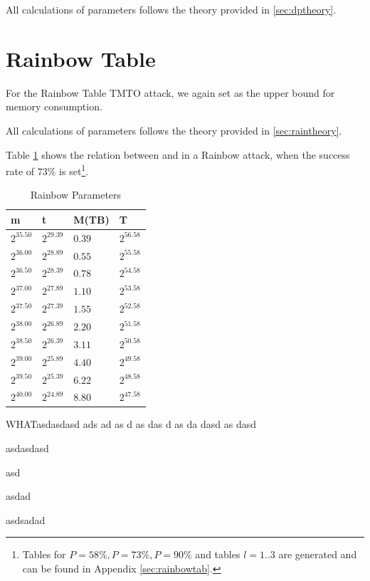 All calculations of parameters follows the theory provided in \ref{sec:dptheory}.
\newpage
\section{Rainbow Table}
For the Rainbow Table TMTO attack, we again set  as the
upper bound for memory consumption. 

All calculations of parameters follows the theory provided in
\ref{sec:raintheory}. 

Table \ref{tab:rainparam1} shows the relation between  and
 in a Rainbow attack, when the success rate of $73\%$ is set\footnote{Tables for $P = 58\%, P = 73\%, P = 90\%$ and tables $l=1..3$ are generated and can be
found in Appendix \ref{sec:rainbowtab}.}.
\begin{table}[H]
  \centering
  \begin{tabular}{llll}
    m & t & M(TB) & T \\ \hline
    $2^{35.50}$ & $2^{29.39}$ & $0.39$ & $2^{56.58}$ \\
    $2^{36.00}$ & $2^{28.89}$ & $0.55$ & $2^{55.58}$ \\
    $2^{36.50}$ & $2^{28.39}$ & $0.78$ & $2^{54.58}$ \\
    $2^{37.00}$ & $2^{27.89}$ & $1.10$ & $2^{53.58}$ \\
    $2^{37.50}$ & $2^{27.39}$ & $1.55$ & $2^{52.58}$ \\
    $2^{38.00}$ & $2^{26.89}$ & $2.20$ & $2^{51.58}$ \\
    $2^{38.50}$ & $2^{26.39}$ & $3.11$ & $2^{50.58}$ \\
    $2^{39.00}$ & $2^{25.89}$ & $4.40$ & $2^{49.58}$ \\
    $2^{39.50}$ & $2^{25.39}$ & $6.22$ & $2^{48.58}$ \\
    $2^{40.00}$ & $2^{24.89}$ & $8.80$ & $2^{47.58}$ \\
  \end{tabular}
  \caption{Rainbow Parameters}
  \label{tab:rainparam1}
\end{table}


WHATasdasdasd
ads
ad
as
d
as
das
d
as
da
dasd
as
dasd

asdasdasd

asd

asdad

asdsadad

